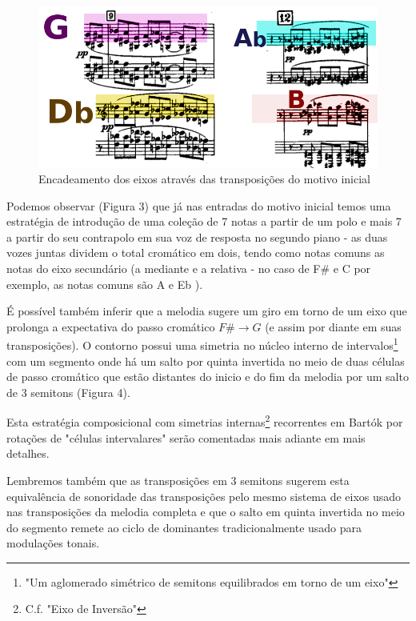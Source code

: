 \documentclass[
	12pt,				%
	openright,			%
	twoside,			%
	a4paper,			%
	english,			%
	french,				%
	spanish,			%
	brazil				%
	]{abntex2}
\begin{document}
\begin{figure}[!h]
	\caption{\label{fig_grafico}Encadeamento dos eixos através das transposições do motivo inicial }
	\begin{center}
	    \includegraphics[scale=0.4]{axis/sonata2pianos_mm9-12.png}
	\end{center}
\end{figure}


Podemos observar (Figura 3) que já nas entradas do motivo inicial temos uma estratégia de introdução de uma coleção de 7 notas a partir de um polo e mais 7 a partir do seu contrapolo em sua voz de resposta no segundo piano - as duas vozes juntas dividem o total cromático em dois, tendo como notas comuns as notas do eixo secundário (a mediante e a relativa - no caso de F\# e C por exemplo, as notas comuns são A e Eb ).

É possível também inferir que a melodia sugere um giro em torno de um eixo que prolonga a expectativa do passo cromático $F\# \rightarrow G$ (e assim por diante em suas transposições). O contorno possui uma simetria no núcleo interno de intervalos\footnote{"Um aglomerado simétrico de semitons equilibrados em torno de um eixo"\cite[ p.120]{straus2004}} com um segmento onde há um salto por quinta invertida no meio de duas células de passo cromático que estão distantes do inicio e do fim da melodia por um salto de 3 semitons (Figura 4). 

Esta estratégia composicional com simetrias internas\footnote{C.f. "Eixo de Inversão"\cite[ p.121]{straus2004}} recorrentes em Bartók por rotações de "células intervalares"\cite[ p.128]{susanni_antokoletz2012music} serão comentadas mais adiante em mais detalhes. 

Lembremos também que as transposições em 3 semitons sugerem esta equivalência de sonoridade das transposições pelo mesmo sistema de eixos usado nas transposições da melodia completa e que o salto em quinta invertida no meio do segmento remete ao ciclo de dominantes tradicionalmente usado para modulações tonais.
\end{document}
